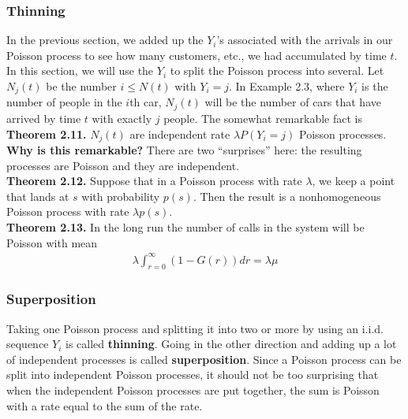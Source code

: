 \documentclass[12pt]{article}
\begin{document}

\subsubsection{Thinning}

In the previous section, we added up the $Y_i$'s associated with the arrivals in our Poisson process to see how many customers, etc., we had accumulated by time $t$. In this section, we will use the $Y_i$ to split the Poisson process into several. Let $N_j(t)$ be the number $i \leq N(t)$ with $Y_i = j$. In Example 2.3, where $Y_i$ is the number of people in the $i$th car, $N_j(t)$ will be the number of cars that have arrived by time $t$ with exactly $j$ people. The somewhat remarkable fact is\\

\textbf{Theorem 2.11.} $N_j(t)$ are independent rate $\lambda P(Y_i = j)$ Poisson processes.\\

\textbf{Why is this remarkable?} There are two ``surprises'' here: the resulting processes are Poisson and they are independent.\\

\textbf{Theorem 2.12.} Suppose that in a Poisson process with rate $\lambda$, we keep a point that lands at $s$ with probability $p(s)$. Then the result is a nonhomogeneous Poisson process with rate $\lambda p(s)$.\\

\textbf{Theorem 2.13.} In the long run the number of calls in the system will be Poisson with mean
\begin{align*}
\lambda \int_{r=0}^{\infty} (1 - G(r)) dr = \lambda \mu
\end{align*}


\subsubsection{Superposition}

Taking one Poisson process and splitting it into two or more by using an i.i.d. sequence $Y_i$ is called \textbf{thinning}. Going in the other direction and adding up a lot of independent processes is called \textbf{superposition}. Since a Poisson process can be split into independent Poisson processes, it should not be too surprising that when the independent Poisson processes are put together, the sum is Poisson with a rate equal to the sum of the rate.\\
\end{document}
